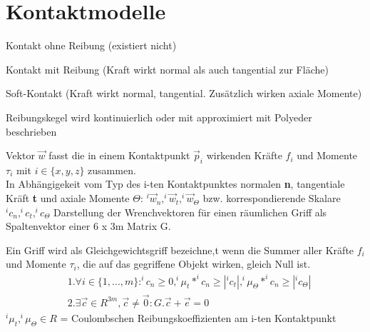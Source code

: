 \section{Kontaktmodelle}
\begin{compactitem}
    \item Kontakt ohne Reibung (existiert nicht)
    \item Kontakt mit Reibung (Kraft wirkt normal als auch tangential zur Fläche)
    \item Soft-Kontakt (Kraft wirkt normal, tangential. Zusätzlich wirken axiale Momente)
\end{compactitem}
Reibungskegel wird kontinuierlich oder mit approximiert mit Polyeder beschrieben

Vektor $\vec{w}$ fasst die in einem Kontaktpunkt $\vec{p}_i$ wirkenden Kräfte $f_i$ und Momente
$\tau_i$ mit $i \in \{x,y,z\}$ zusammen. \\
In Abhängigekeit vom Typ des i-ten Kontaktpunktes normalen \textbf{n}, tangentiale Kräft \textbf{t} und
axiale Momente \textbf{$\Theta$}: $^i\vec{w}_n, ^i\vec{w}_t, ^i\vec{w}_\Theta$ bzw. korrespondierende
Skalare $^ic_n, ^ic_t, ^ic_\Theta$
Darstellung der Wrenchvektoren für einen räumlichen Griff als Spaltenvektor einer 6 x 3m Matrix G.

Ein Griff wird als Gleichgewichtsgriff bezeichne,t wenn die Summer aller Kräfte $f_i$ und Momente
$\tau_i$, die auf das gegriffene Objekt wirken, gleich Null ist.
\begin{align}
    &1. \forall i \in \{1, ...,m\} : ^ic_n \geq 0, ^i\mu_t * ^ic_n \geq |^ic_t|, ^i\mu_\Theta * ^ic_n
    \geq |^ic_\Theta| \\
    &2. \exists \vec{c} \in R^{3m}, \vec{c} \neq \vec{0} : G.\vec{c} + \vec{e} = 0
\end{align}
$^i\mu_t, ^i\mu_\Theta \in R$ = Coulombschen Reibungskoeffizienten am i-ten Kontaktpunkt
